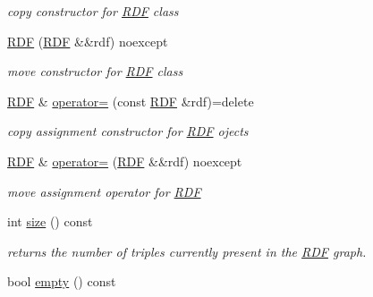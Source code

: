 \begin{DoxyCompactItemize}
\begin{DoxyCompactList}\small\item\em copy constructor for \hyperlink{classomexmeta_1_1RDF}{R\+DF} class \end{DoxyCompactList}\item 
\mbox{\label{classomexmeta_1_1RDF_a6490b2ea0d10e3026bea587a305b7fb9}} 
\hyperlink{classomexmeta_1_1RDF_a6490b2ea0d10e3026bea587a305b7fb9}{R\+DF} (\hyperlink{classomexmeta_1_1RDF}{R\+DF} \&\&rdf) noexcept
\begin{DoxyCompactList}\small\item\em move constructor for \hyperlink{classomexmeta_1_1RDF}{R\+DF} class \end{DoxyCompactList}\item 
\hyperlink{classomexmeta_1_1RDF}{R\+DF} \& \hyperlink{classomexmeta_1_1RDF_a9d1b20d798969d3c1dac412c621247b9}{operator=} (const \hyperlink{classomexmeta_1_1RDF}{R\+DF} \&rdf)=delete
\begin{DoxyCompactList}\small\item\em copy assignment constructor for \hyperlink{classomexmeta_1_1RDF}{R\+DF} ojects \end{DoxyCompactList}\item 
\mbox{\label{classomexmeta_1_1RDF_ae3739bda3be0986547c31559381f3df4}} 
\hyperlink{classomexmeta_1_1RDF}{R\+DF} \& \hyperlink{classomexmeta_1_1RDF_ae3739bda3be0986547c31559381f3df4}{operator=} (\hyperlink{classomexmeta_1_1RDF}{R\+DF} \&\&rdf) noexcept
\begin{DoxyCompactList}\small\item\em move assignment operator for \hyperlink{classomexmeta_1_1RDF}{R\+DF} \end{DoxyCompactList}\item 
\mbox{\label{classomexmeta_1_1RDF_a63247bb3a05957abf7320c060543c3ca}} 
int \hyperlink{classomexmeta_1_1RDF_a63247bb3a05957abf7320c060543c3ca}{size} () const
\begin{DoxyCompactList}\small\item\em returns the number of triples currently present in the \hyperlink{classomexmeta_1_1RDF}{R\+DF} graph. \end{DoxyCompactList}\item 
bool \hyperlink{classomexmeta_1_1RDF_ab6525e8db606ffd48425b05ad2a204d8}{empty} () const

\end{DoxyCompactItemize}
